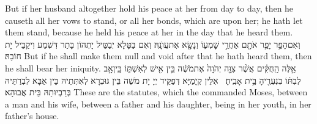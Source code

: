 {But if her husband altogether hold his peace at her from day to day, then he causeth all her vows to stand, or all her bonds, which are upon her; he hath let them stand, because he held his peace at her in the day that he heard them.}{}
{וְאִם\maqqaf הָפֵ֥ר יָפֵ֛ר אֹתָ֖ם אַחֲרֵ֣י שׇׁמְע֑וֹ וְנָשָׂ֖א אֶת\maqqaf עֲוֺנָֽהּ׃}
{וְאִם בַּטָּלָא יְבַטֵּיל יָתְהוֹן בָּתַר דִּשְׁמַע וִיקַבֵּיל יָת חוֹבַהּ׃}
{But if he shall make them null and void after that he hath heard them, then he shall bear her iniquity.}{}
{אֵ֣לֶּה הַֽחֻקִּ֗ים אֲשֶׁ֨ר צִוָּ֤ה יְהֹוָה֙ אֶת\maqqaf מֹשֶׁ֔ה בֵּ֥ין אִ֖ישׁ לְאִשְׁתּ֑וֹ בֵּֽין\maqqaf אָ֣ב לְבִתּ֔וֹ בִּנְעֻרֶ֖יהָ בֵּ֥ית אָבִֽיהָ׃ \petucha }
{אִלֵּין קְיָמַיָּא דְּפַקֵּיד יְיָ יָת מֹשֶׁה בֵּין גּוּבְרָא לְאִתְּתֵיהּ בֵּין אַבָּא לִבְרַתֵּיהּ בְּרַבְיוּתַהּ בֵּית אֲבוּהָא׃}
{These are the statutes, which the \lord\space commanded Moses, between a man and his wife, between a father and his daughter, being in her youth, in her father’s house.}{}

